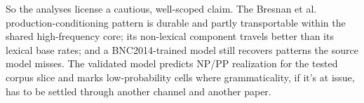 So the analyses license a cautious, well-scoped claim. The Bresnan et al.
production-conditioning pattern is durable and partly transportable within the
shared high-frequency core; its non-lexical component travels better than its
lexical base rates; and a BNC2014-trained model still recovers patterns the
source model misses. The validated model predicts NP/PP realization for the
tested corpus slice and marks low-probability cells where grammaticality, if
it's at issue, has to be settled through another channel and another paper.
